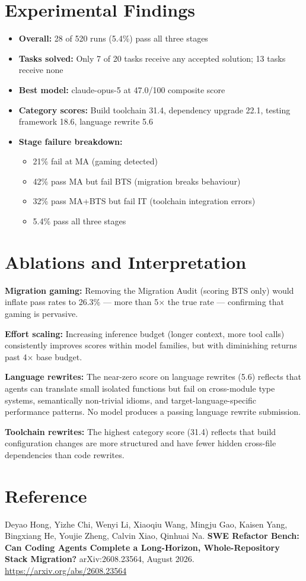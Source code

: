 \documentclass[10pt,twocolumn]{article}
\begin{document}
\section{Experimental Findings}

\begin{itemize}[itemsep=2pt,parsep=0pt]
  \item \textbf{Overall:} 28 of 520 runs (5.4\%) pass all three stages
  \item \textbf{Tasks solved:} Only 7 of 20 tasks receive any accepted
    solution; 13 tasks receive none
  \item \textbf{Best model:} claude-opus-5 at 47.0/100 composite score
  \item \textbf{Category scores:} Build toolchain 31.4, dependency
    upgrade 22.1, testing framework 18.6, language rewrite 5.6
  \item \textbf{Stage failure breakdown:}
    \begin{itemize}[itemsep=1pt,parsep=0pt]
      \item 21\% fail at MA (gaming detected)
      \item 42\% pass MA but fail BTS (migration breaks behaviour)
      \item 32\% pass MA+BTS but fail IT (toolchain integration errors)
      \item 5.4\% pass all three stages
    \end{itemize}
\end{itemize}

\section{Ablations and Interpretation}

\textbf{Migration gaming:} Removing the Migration Audit (scoring BTS
only) would inflate pass rates to 26.3\% — more than 5$\times$ the
true rate — confirming that gaming is pervasive.

\textbf{Effort scaling:} Increasing inference budget (longer context,
more tool calls) consistently improves scores within model families,
but with diminishing returns past 4$\times$ base budget.

\textbf{Language rewrites:} The near-zero score on language rewrites
(5.6) reflects that agents can translate small isolated functions but
fail on cross-module type systems, semantically non-trivial idioms,
and target-language-specific performance patterns. No model produces
a passing language rewrite submission.

\textbf{Toolchain rewrites:} The highest category score (31.4) reflects
that build configuration changes are more structured and have fewer
hidden cross-file dependencies than code rewrites.

\section*{Reference}

Deyao Hong, Yizhe Chi, Wenyi Li, Xiaoqiu Wang, Mingju Gao,
Kaisen Yang, Bingxiang He, Youjie Zheng, Calvin Xiao, Qinhuai Na.
\textbf{SWE Refactor Bench: Can Coding Agents Complete a
Long-Horizon, Whole-Repository Stack Migration?}
arXiv:2608.23564, August 2026.
\url{https://arxiv.org/abs/2608.23564}
\end{document}
